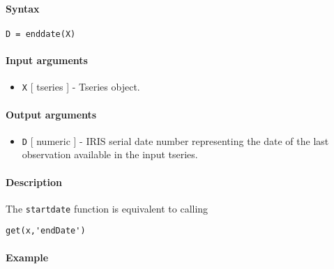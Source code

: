 


	\paragraph{Syntax}

\begin{verbatim}
D = enddate(X)
\end{verbatim}

\paragraph{Input arguments}

\begin{itemize}
\itemsep1pt\parskip0pt
\item
  \texttt{X} {[} tseries {]} - Tseries object.
\end{itemize}

\paragraph{Output arguments}

\begin{itemize}
\itemsep1pt\parskip0pt
\item
  \texttt{D} {[} numeric {]} - IRIS serial date number representing the
  date of the last observation available in the input tseries.
\end{itemize}

\paragraph{Description}

The \texttt{startdate} function is equivalent to calling

\begin{verbatim}
get(x,'endDate')
\end{verbatim}

\paragraph{Example}


